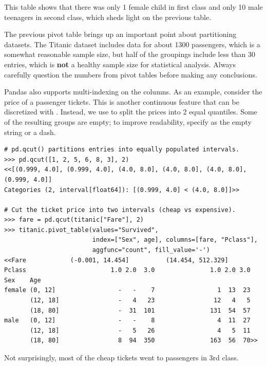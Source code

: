 This table shows that there was only 1 female child in first class and only 10 male teenagers in second class, which sheds light on the previous table.

\begin{warn}
The previous pivot table brings up an important point about partitioning datasets.
The Titanic dataset includes data for about 1300 passengers, which is a somewhat reasonable sample size, but half of the groupings include less than 30 entries, which is \textbf{not} a healthy sample size for statistical analysis.
Always carefully question the numbers from pivot tables before making any conclusions.
\end{warn}

Pandas also supports multi-indexing on the columns.
As an example, consider the price of a passenger tickets.
This is another continuous feature that can be discretized with .
Instead, we use  to split the prices into 2 equal quantiles.
Some of the resulting groups are empty; to improve readability, specify  as the empty string or a dash.

\begin{lstlisting}
# pd.qcut() partitions entries into equally populated intervals.
>>> pd.qcut([1, 2, 5, 6, 8, 3], 2)
<<[(0.999, 4.0], (0.999, 4.0], (4.0, 8.0], (4.0, 8.0], (4.0, 8.0], (0.999, 4.0]]
Categories (2, interval[float64]): [(0.999, 4.0] < (4.0, 8.0]]>>

# Cut the ticket price into two intervals (cheap vs expensive).
>>> fare = pd.qcut(titanic["Fare"], 2)
>>> titanic.pivot_table(values="Survived",
                        index=["Sex", age], columns=[fare, "Pclass"],
                        aggfunc="count", fill_value='-')
<<Fare            (-0.001, 14.454]          (14.454, 512.329]
Pclass                       1.0 2.0  3.0               1.0 2.0 3.0
Sex    Age
female (0, 12]                 -   -    7                 1  13  23
       (12, 18]                -   4   23                12   4   5
       (18, 80]                -  31  101               131  54  57
male   (0, 12]                 -   -    8                 4  11  27
       (12, 18]                -   5   26                 4   5  11
       (18, 80]                8  94  350               163  56  70>>
\end{lstlisting}

Not surprisingly, most of the cheap tickets went to passengers in 3rd class.

